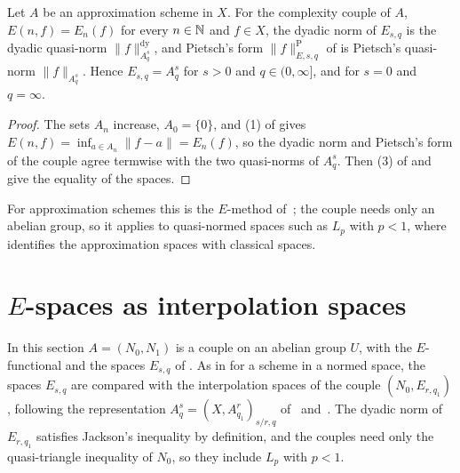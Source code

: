 \begin{theorem}
\label{thm:complexity-couple-approx}
\leanok
{}
Let $A$ be an approximation scheme in $X$. For the complexity couple of $A$, $E(n, f) = E_n(f)$
for every $n \in \mathbb{N}$ and $f \in X$, the dyadic norm of $E_{s, q}$ is the dyadic quasi-norm
$\|f\|^{\mathrm{dy}}_{A^s_q}$, and Pietsch's form $\|f\|^{\mathrm{P}}_{E, s, q}$ of
 is Pietsch's quasi-norm $\|f\|_{A^s_q}$. Hence $E_{s, q} = A^s_q$ for
$s > 0$ and $q \in (0, \infty]$, and for $s = 0$ and $q = \infty$.
\end{theorem}

\begin{proof}
\leanok
The sets $A_n$ increase, $A_0 = \{0\}$, and (1) of  gives
$E(n, f) = \inf_{a \in A_n} \|f - a\| = E_n(f)$, so the dyadic norm and Pietsch's form of the
couple agree termwise with the two quasi-norms of $A^s_q$. Then (3) of
 and  give the equality of the spaces.
\end{proof}

For approximation schemes this is the $E$-method of~\cite[Section~7.1]{BerghLofstrom}; the
couple needs only an abelian group, so it applies to quasi-normed spaces such as $L_p$ with
$p < 1$, where  identifies the approximation spaces with classical
spaces.

\section{\texorpdfstring{$E$}{E}-spaces as interpolation spaces}
\label{sec:e-spaces-interpolate}

In this section $A = (N_0, N_1)$ is a couple on an abelian group $U$, with the $E$-functional and
the spaces $E_{s, q}$ of . As in
 for a scheme in a normed space, the spaces
$E_{s, q}$ are compared with the interpolation spaces of the couple $(N_0, E_{r, q_1})$,
following the representation $A^s_q = (X, A^r_{q_1})_{s/r, q}$ of~\cite{Pietsch, DeVorePopovLNM}
and~\cite[\S 4.3, Theorem~2]{DeVore1998}. The dyadic norm of $E_{r, q_1}$ satisfies Jackson's
inequality by definition, and the couples need only the quasi-triangle inequality of $N_0$, so
they include $L_p$ with $p < 1$.

